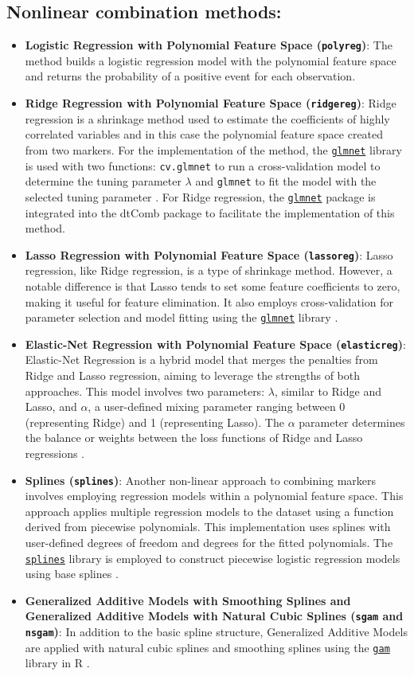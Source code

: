 \documentclass[10pt]{article}
\newcommand{\CRANpkg}[1]{\href{https://cran.r-project.org/web/packages/#1/index.html}{\texttt{#1}}}
\newcommand{\Rfunction}[1]{\texttt{#1}}
\begin{document}
\subsection{Nonlinear combination methods:}
\begin{itemize}
  \item \textbf{Logistic Regression with Polynomial Feature Space (\texttt{polyreg})}: The method builds a logistic regression model with the polynomial feature space and returns the probability of a positive event for each observation.
 \item \textbf{Ridge Regression with Polynomial Feature Space (\texttt{ridgereg})}: Ridge regression is a shrinkage method used to estimate the coefficients of highly correlated variables and in this case the polynomial feature space created from two markers. For the implementation of the method, the \CRANpkg{glmnet} library is used with two functions: \Rfunction{cv.glmnet} to run a cross-validation model to determine the tuning parameter $\lambda$ and \Rfunction{glmnet} to fit the model with the selected tuning parameter \citep{friedman2010regularization}. For Ridge regression, the \CRANpkg{glmnet} package is integrated into the dtComb package to facilitate the implementation of this method.
  \item \textbf{Lasso Regression with Polynomial Feature Space (\texttt{lassoreg})}: Lasso regression, like Ridge regression, is a type of shrinkage method. However, a notable difference is that Lasso tends to set some feature coefficients to zero, making it useful for feature elimination. It also employs cross-validation for parameter selection and model fitting using the \CRANpkg{glmnet} library \citep{friedman2010regularization}.
  \item \textbf{Elastic-Net Regression with Polynomial Feature Space (\texttt{elasticreg})}: Elastic-Net Regression is a hybrid model that merges the penalties from Ridge and Lasso regression, aiming to leverage the strengths of both approaches. This model involves two parameters: $\lambda$, similar to Ridge and Lasso, and $\alpha$, a user-defined mixing parameter ranging between 0 (representing Ridge) and 1 (representing Lasso). The $\alpha$ parameter determines the balance or weights between the loss functions of Ridge and Lasso regressions \citep{friedman2010regularization}.
  \item \textbf{Splines (\texttt{splines})}: Another non-linear approach to combining markers involves employing regression models within a polynomial feature space. This approach applies multiple regression models to the dataset using a function derived from piecewise polynomials. This implementation uses splines with user-defined degrees of freedom and degrees for the fitted polynomials. The \CRANpkg{splines} library is employed to construct piecewise logistic regression models using base splines \citep{team2013r}.
  \item \textbf{Generalized Additive Models with Smoothing Splines and Generalized Additive Models with Natural Cubic Splines (\texttt{sgam} and \texttt{nsgam})}: In addition to the basic spline structure, Generalized Additive Models are applied with natural cubic splines and smoothing splines using the \CRANpkg{gam} library in R \citep{hastie2019gam}.
\end{itemize}
\end{document}
